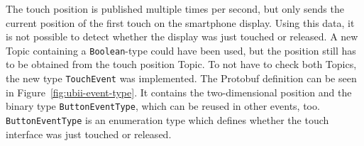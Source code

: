 The touch position is published multiple times per second, but only sends the current position of the first touch on the smartphone display. Using this data, it is not possible to detect whether the display was just touched or released. A new Topic containing a \lstinline{Boolean}-type could have been used, but the position still has to be obtained from the touch position Topic. To not have to check both Topics, the new type \lstinline{TouchEvent} was implemented. The \ac{Protobuf} definition can be seen in Figure~\ref{fig:ubii-event-type}. It contains the two-dimensional position and the binary type \mbox{\lstinline{ButtonEventType},} which can be reused in other events, too. \lstinline{ButtonEventType} is an enumeration type which defines whether the touch interface was just touched or released.
